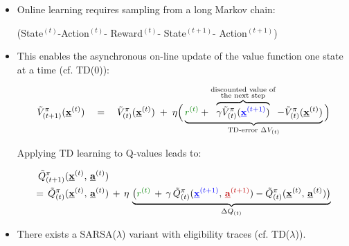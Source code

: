 \begin{frame}\frametitle{\subsecname}
	\begin{itemize}
		\item Online learning requires sampling from a long Markov chain:\\
		\begin{center}
			(State$^{(t)}$-Action$^{(t)}$-{\color{reward} Reward$^{(t)}$}-{\color{trans} State$^{(t+1)}$}-{\color{policy} Action$^{(t+1)}$})
		\end{center}
		\vspace{2mm}
		\item This enables the asynchronous on-line update of the value function one state at a time (cf. TD($0$)):
		
		\slidesonly{\vspace{-7mm}}
		
		\begin{equation}
			\tilde V^{\pi}_{(t+1)}(\vec x^{(t)}) \quad = \quad 
			\tilde V^{\pi}_{(t)}(\vec x^{(t)}) \;+\;
			\lr \Big( \underbrace{{\color{reward}r^{(t)}} 
			+ \overbrace{
			\gamma \tilde V^{\pi}_{(t)}({\color{trans}\vec x^{(t+1)}})
			}^{\substack{\text{discounted value of}\\ \text{the next step}}} 
			- \tilde V^{\pi}_{(t)}{(\vec x^{(t)})}}_{\text{TD-error }\Delta V_{(t)}} \Big) 
		\end{equation}
		
		\slidesonly{\vspace{-3mm}}
	
		Applying TD learning to Q-values leads to:
		
		\slidesonly{\vspace{-4mm}}
	
		\begin{align}
			\tilde{Q}^\pi_{(t+1)}(\vec x^{(t)},\, \vec a^{(t)} ) &\\
			 = \, \tilde{Q}^\pi_{(t)} ( \vec x^{(t)},\, \vec a^{(t)} )& \, + \, \eta \, \underbrace{ \big( {\color{reward} r^{(t)}} \, + \, \gamma \, \tilde{Q}^\pi_{(t)} ({\color{trans}  \vec x^{(t+1)}},\,{\color{policy}  \vec a^{(t+1)}} ) - \tilde{Q}^\pi_{(t)} ( \vec x^{(t)},\, \vec a^{(t)} ) \big)}_{\Delta Q_{(t)}}
		\end{align}
		
		\slidesonly{\vspace{-3mm}}
		
		\item There exists a SARSA($\lambda$) variant with eligibility traces (cf. TD($\lambda$)).
	\end{itemize}

\end{frame}

